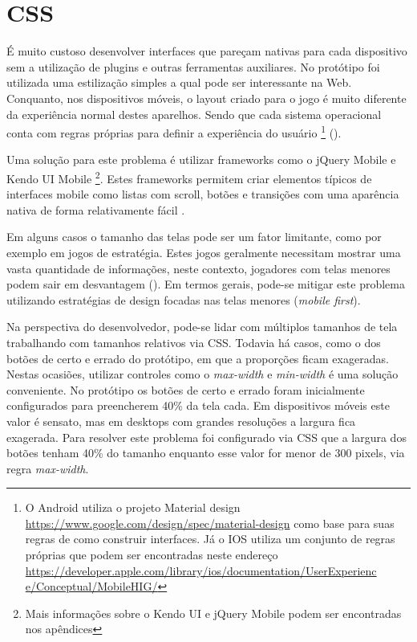 \section{CSS}

É muito custoso desenvolver interfaces que pareçam nativas
para cada dispositivo sem a utilização de plugins e outras
ferramentas auxiliares. No protótipo foi utilizada uma estilização
simples a qual pode ser interessante na Web. Conquanto, nos
dispositivos móveis, o layout criado para o jogo é muito diferente
da experiência normal destes aparelhos. Sendo que cada sistema
operacional conta com regras próprias para definir a experiência
do usuário \footnote{ O Android utiliza o projeto Material design
\url{https://www.google.com/design/spec/material-design} como base
para suas regras de como construir interfaces. Já o IOS utiliza um
conjunto de regras próprias que podem ser encontradas neste endereço
\url{https://developer.apple.com/library/ios/documentation/UserExperienc
e/Conceptual/MobileHIG/}} ().

Uma solução para este problema é utilizar frameworks como o jQuery
Mobile e Kendo UI Mobile \footnote{Mais informações sobre o Kendo UI
e jQuery Mobile podem ser encontradas nos apêndices}. Estes frameworks
permitem criar elementos típicos de interfaces mobile como listas
com scroll, botões e transições com uma aparência nativa de forma
relativamente fácil \autocite{publishHtml5}.

Em alguns casos o tamanho das telas pode ser um fator limitante,
como por exemplo em jogos de estratégia. Estes jogos geralmente
necessitam mostrar uma vasta quantidade de informações, neste
contexto, jogadores com telas menores podem sair em desvantagem
(). Em
termos gerais, pode-se mitigar este problema utilizando estratégias de
design focadas nas telas menores (\textit{mobile first}).


Na perspectiva do desenvolvedor, pode-se lidar com múltiplos tamanhos
de tela trabalhando com tamanhos relativos via CSS. Todavia há
casos, como o dos botões de certo e errado do protótipo, em que a
proporções ficam exageradas. Nestas ocasiões, utilizar controles como
o \textit{max-width} e \textit{min-width} é uma solução conveniente.
No protótipo os botões de certo e errado foram inicialmente
configurados para preencherem 40\% da tela cada. Em dispositivos móveis
este valor é sensato, mas em desktops com grandes resoluções a
largura fica exagerada. Para resolver este problema foi configurado via
CSS que a largura dos botões tenham 40\% do tamanho enquanto esse valor
for menor de 300 pixels, via regra \textit{max-width}.

